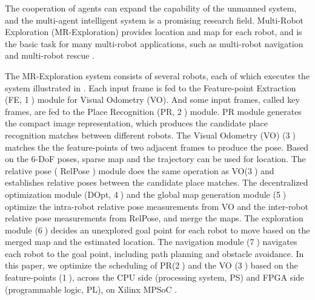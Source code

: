 \label{sec:intro}

The cooperation of agents can expand the capability of the unmanned system, and the multi-agent intelligent system is a promising research field.
Multi-Robot Exploration (MR-Exploration) \cite{corah2019communication} provides location and map for each robot, and is the basic task for many multi-robot applications, such as multi-robot navigation \cite{tanner2005towards} and multi-robot rescue \cite{baxter2007multi}.

The  MR-Exploration system \cite{corah2019communication, cieslewski2018data} consists of several robots, each of which executes the system illustrated in . Each input frame is fed to the Feature-point Extraction (FE, \textcircled{1}) module for Visual Odometry (VO). 
And some input frames, called key frames, are fed to the Place Recognition (PR, \textcircled{2}) module.
PR module generates the compact image representation, which produces the candidate place recognition matches between different robots. The Visual Odometry (VO) (\textcircled{3}) matches the the feature-points of two adjacent frames to produce the pose. Based on the 6-DoF poses,  sparse map and the trajectory can be used for location. The relative pose ( RelPose ) module does the same operation as VO(\textcircled{3}) and establishes relative poses between the candidate place matches. The decentralized optimization module (DOpt, \textcircled{4}) and the global map generation module (\textcircled{5}) optimize the intra-robot relative pose measurements from VO and the inter-robot relative pose measurements from RelPose, and merge the maps. The exploration module (\textcircled{6}) decides an unexplored goal point for each robot to move based on the merged map and the estimated location. The navigation module (\textcircled{7}) navigates each robot to the goal point, including path planning and obstacle avoidance.
In this paper, we optimize the scheduling of PR(\textcircled{2}) and the VO (\textcircled{3}) based on the feature-points (\textcircled{1}), across the CPU side (processing system, PS) and FPGA side (programmable logic, PL), on Xilinx MPSoC \cite{MPSoC}.

